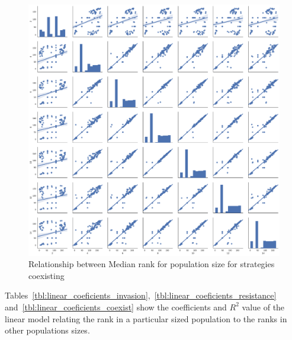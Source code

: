 \documentclass{article}
\begin{document}
\begin{figure}[!hbtp]
    \centering
    \includegraphics[width=\textwidth]{../img/relationship_between_median_ranks_coexist.pdf}
    \caption{Relationship between Median rank for population size for strategies
    coexisting}
    \label{fig:relationship_ranks_v_size_coexist}
\end{figure}

Tables~\ref{tbl:linear_coeficients_invasion},~\ref{tbl:linear_coeficients_resistance}
and~\ref{tbl:linear_coeficients_coexist} show the coefficients and \(R^2\) value
of the linear model relating the rank in a particular sized population to the
ranks in other populations sizes.
\end{document}
